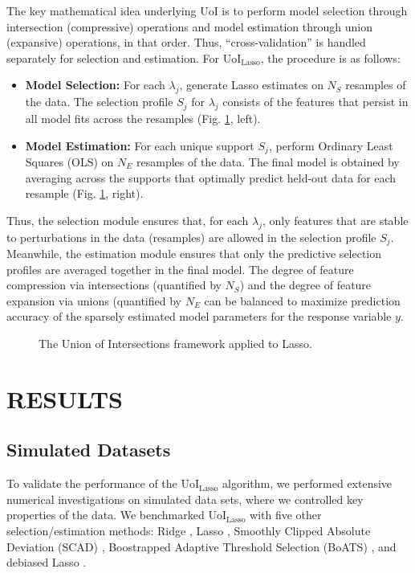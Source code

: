 \documentclass[letterpaper, 10 pt, conference]{ieeeconf}  %
\begin{document}
The key mathematical idea underlying UoI is to perform
model selection through intersection (compressive) operations and model estimation through union (expansive) operations, in that order. Thus, ``cross-validation'' is handled separately for selection and estimation. For UoI$_{\text{Lasso}}$, the procedure is as follows:
\begin{itemize}
    \item \textbf{Model Selection:} For each $\lambda_j$, generate Lasso estimates on $N_S$ resamples of the data. The selection profile $S_j$ for $\lambda_j$ consists of the features that persist in all model fits across the resamples (Fig. \ref{fig:uoi}, left).
    \item \textbf{Model Estimation:} For each unique support $S_j$, perform Ordinary Least Squares (OLS) on $N_E$ resamples of the data. The final model is obtained by averaging across the supports that optimally predict held-out data for each resample (Fig. \ref{fig:uoi}, right). 
\end{itemize}
Thus, the selection module ensures that, for each $\lambda_j$, only features that are stable to perturbations in the data (resamples) are allowed in the selection profile $S_j$. Meanwhile, the estimation module ensures that only the predictive selection profiles are averaged together in the final model. The degree of feature compression via intersections (quantified by $N_S$) and the degree of feature expansion via unions (quantified by $N_E$ can be balanced to maximize prediction accuracy of the sparsely estimated model parameters for the response variable $y$.
\begin{figure}[b]
    \centering
    \caption{The Union of Intersections framework applied to Lasso.}
    \label{fig:uoi}
\end{figure}
\section{RESULTS}
\subsection{Simulated Datasets}
To validate the performance of the UoI$_{\text{Lasso}}$ algorithm, we performed extensive numerical investigations on simulated data sets, where we controlled key properties of the data. We benchmarked UoI$_{\text{Lasso}}$ with five other selection/estimation methods: Ridge \cite{elements}, Lasso \cite{lasso}, Smoothly Clipped Absolute Deviation (SCAD) \cite{scad}, Boostrapped Adaptive Threshold Selection (BoATS) \cite{boats}, and debiased Lasso \cite{dbLasso}. 
\end{document}
